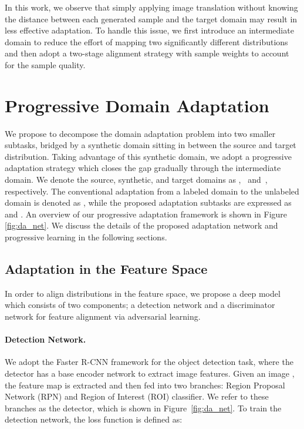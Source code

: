 \documentclass[10pt,twocolumn,letterpaper]{article}
\begin{document}
In this work, we observe that simply applying image translation without knowing the distance between each generated sample and the target domain may result in less effective adaptation.
To handle this issue, we first introduce an intermediate domain to reduce the effort of mapping two significantly different distributions and then adopt a two-stage 
alignment strategy with sample weights to account for the sample quality.



\section{Progressive Domain Adaptation}
We propose to decompose the domain adaptation problem into two smaller subtasks, bridged by a synthetic domain sitting in between the source and target distribution.
Taking advantage of this synthetic domain, we adopt a progressive adaptation strategy which closes the gap gradually through the intermediate domain.
We denote the source, synthetic, and target domains as ,~ and~, respectively.
The conventional adaptation from a labeled domain  to the unlabeled domain  is denoted as ,
while the proposed adaptation subtasks are expressed as  and .
An overview of our progressive adaptation framework is shown in Figure \ref{fig:da_net}.
We discuss the details of the proposed adaptation network and progressive learning in the following sections.


\subsection{Adaptation in the Feature Space}
In order to align distributions in the feature space, we propose a deep model which consists of two components; a detection network and a discriminator network for feature alignment via adversarial learning.
\vspace{-2mm}\paragraph{Detection Network.} We adopt the Faster R-CNN \cite{Ren_2017} framework for the object detection task, where the detector has a base encoder network  to extract image features.
Given an image , the feature map  is extracted and then fed into two branches: Region Proposal Network (RPN) and Region of Interest (ROI) classifier. We refer to these branches as the detector, which is shown in Figure~\ref{fig:da_net}.
To train the detection network, the loss function  is defined as:
\end{document}
